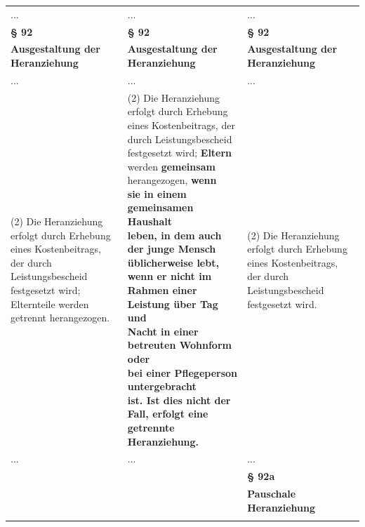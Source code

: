 \documentclass[10pt,a4paper,landscape]{article}
\begin{document}
\begin{longtable}{|L{8.2cm}|L{8.2cm}|L{8.2cm}|}
\hhline{|---|}
... & ... & ... \\
\hhline{|---|}
\textbf{\S{} 92} & \textbf{\S{} 92} & \textbf{\S{} 92} \\
\hhline{|---|}
\textbf{Ausgestaltung der Heranziehung } & \textbf{Ausgestaltung der Heranziehung } & \textbf{Ausgestaltung der Heranziehung } \\
\hhline{|---|}
... & ... & ... \\
\hhline{|---|}
(2) Die Heranziehung erfolgt durch  \newline Erhebung eines Kostenbeitrags, der durch  \newline Leistungsbescheid festgesetzt \textcolor{diffred}{wird;  \newline Elternteile werden getrennt herangezogen.} & (2) Die Heranziehung erfolgt durch  \newline Erhebung eines Kostenbeitrags, der durch  \newline Leistungsbescheid festgesetzt \textcolor{diffred}{wird; }\textbf{\textcolor{diffred}{Eltern}}\textcolor{diffred}{  \newline werden }\textbf{\textcolor{diffred}{gemeinsam}}\textcolor{diffred}{ herangezogen, }\textbf{\textcolor{diffred}{wenn  \newline sie in einem gemeinsamen Haushalt  \newline leben, in dem auch der junge Mensch  \newline üblicherweise lebt, wenn er nicht im  \newline Rahmen einer Leistung über Tag und  \newline Nacht in einer betreuten Wohnform oder  \newline bei einer Pflegeperson untergebracht  \newline ist. Ist dies nicht der Fall, erfolgt eine  \newline getrennte Heranziehung.}} & (2) Die Heranziehung erfolgt durch  \newline Erhebung eines Kostenbeitrags, der durch  \newline Leistungsbescheid festgesetzt \textcolor{diffgreen}{wird.} \\
\hhline{|---|}
... & ... & ... \\
\hhline{|---|}
 &  & \textbf{\textcolor{diffgreen}{\S{} 92a}} \\
\hhline{|---|}
 &  & \textbf{\textcolor{diffgreen}{Pauschale Heranziehung}} \\
\hhline{|---|}

\end{longtable}
\end{document}

